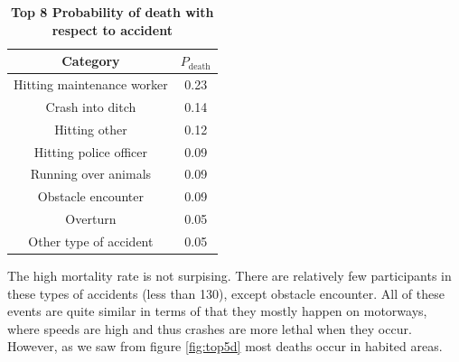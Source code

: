 \begin{table}[H]
	\centering
	\label{tab:prob_death}
	\begin{tabular}{|c|c|}
		\hline
		Category & $P_{\text{death}}$ \\
		\hline
		Hitting maintenance worker & 0.23 \\
		\hline
		Crash into ditch & 0.14 \\
		\hline
		Hitting other & 0.12 \\
		\hline
		Hitting police officer & 0.09 \\
		\hline
		Running over animals & 0.09 \\ 
		\hline
		Obstacle encounter & 0.09 \\
		\hline
		Overturn & 0.05 \\
		\hline
		Other type of accident & 0.05 \\
		\hline
	\end{tabular}
	\caption{\textbf{Top 8 Probability of death with respect to accident}}
\end{table}
\noindent
The high mortality rate is not surpising. There are relatively few participants in these types of accidents (less than 130), except obstacle encounter.
All of these events are quite similar in terms of that they mostly happen on motorways, where speeds are high and thus crashes are more lethal when
they occur. However, as we saw from figure \ref{fig:top5d} most deaths occur in habited areas. \\

